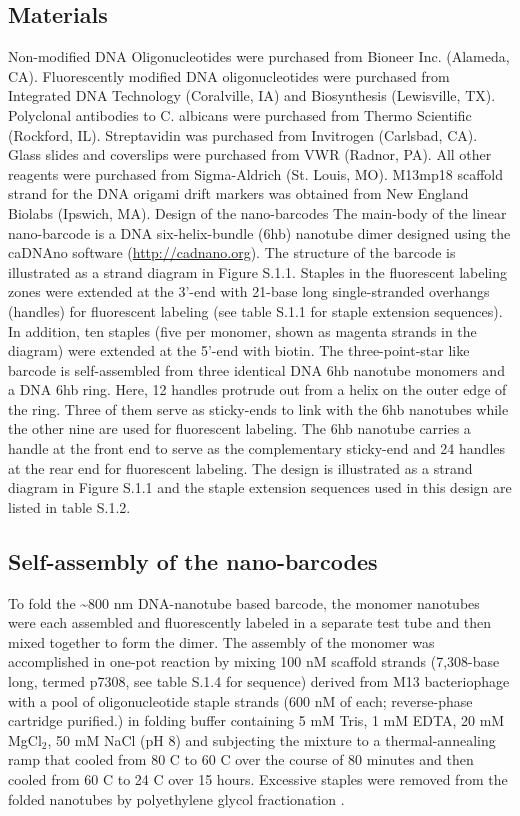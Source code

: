 \subsection{Materials}
Non-modified DNA Oligonucleotides were purchased from Bioneer Inc. (Alameda, CA). Fluorescently modified DNA oligonucleotides were purchased from Integrated DNA Technology (Coralville, IA) and Biosynthesis (Lewisville, TX). Polyclonal antibodies to C. albicans were purchased from Thermo Scientific (Rockford, IL). Streptavidin was purchased from Invitrogen (Carlsbad, CA). Glass slides and coverslips were purchased from VWR (Radnor, PA). All other reagents were purchased from Sigma-Aldrich (St. Louis, MO). M13mp18 scaffold strand for the DNA origami drift markers was obtained from New England Biolabs (Ipswich, MA).
Design of the nano-barcodes
The main-body of the linear nano-barcode is a DNA six-helix-bundle (6hb) nanotube dimer designed using the caDNAno software (\url{http://cadnano.org}). The structure of the barcode is illustrated as a strand diagram in Figure S.1.1. Staples in the fluorescent labeling zones were extended at the 3'-end with 21-base long single-stranded overhangs (handles) for fluorescent labeling (see table S.1.1 for staple extension sequences). In addition, ten staples (five per monomer, shown as magenta strands in the diagram) were extended at the 5'-end with biotin. The three-point-star like barcode is self-assembled from three identical DNA 6hb nanotube monomers and a DNA 6hb ring. Here, 12 handles protrude out from a helix on the outer edge of the ring. Three of them serve as sticky-ends to link with the 6hb nanotubes while the other nine are used for fluorescent labeling. The 6hb nanotube carries a handle at the front end to serve as the complementary sticky-end and 24 handles at the rear end for fluorescent labeling. The design is illustrated as a strand diagram in Figure S.1.1 and the staple extension sequences used in this design are listed in table S.1.2.

\subsection{Self-assembly of the nano-barcodes}
To fold the \textasciitilde800 nm DNA-nanotube based barcode, the monomer nanotubes were each assembled and fluorescently labeled in a separate test tube and then mixed together to form the dimer. The assembly of the monomer was accomplished in one-pot reaction by mixing 100 nM scaffold strands (7,308-base long, termed p7308, see table S.1.4 for sequence) derived from M13 bacteriophage with a pool of oligonucleotide staple strands (600 nM of each; reverse-phase cartridge purified.) in folding buffer containing 5 mM Tris, 1 mM EDTA, 20 mM MgCl$_2$, 50 mM NaCl (pH 8) and subjecting the mixture to a thermal-annealing ramp that cooled from 80 \textdegree C to 60 \textdegree C over the course of 80 minutes and then cooled from 60 \textdegree C to 24 \textdegree C over 15 hours. Excessive staples were removed from the folded nanotubes by polyethylene glycol fractionation \citep{lis_size_1975}.

